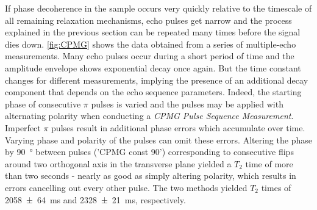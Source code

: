 \documentclass[
    parskip=half, 
    twoside=false,
    twocolumn=true,
    fontsize=11pt,
]{scrarticle}
\begin{document}
If phase decoherence in the sample occurs very quickly relative to the timescale of all remaining relaxation mechanisms, echo pulses get narrow and the process explained in the previous section can be repeated many times before the signal dies down. \autoref{fig:CPMG} shows the data obtained from a series of multiple-echo measurements. Many echo pulses occur during a short period of time and the amplitude envelope shows exponential decay once again. But the time constant changes for different measurements, implying the presence of an additional decay component that depends on the echo sequence parameters. Indeed, the starting phase of consecutive $\pi$ pulses is varied and the pulses may be applied with alternating polarity when conducting a \textit{CPMG Pulse Sequence Measurement}. Imperfect $\pi$ pulses result in additional phase errors which accumulate over time. Varying phase and polarity of the pulses can omit these errors. Altering the phase by \SI{90}{\degree} between pulses ('CPMG const 90') corresponding to consecutive flips around two orthogonal axis in the transverse plane yielded a $T_2$ time of more than two seconds - nearly as good as simply altering polarity, which results in errors cancelling out every other pulse. The two methods yielded $T_2$ times of \SI{2058 \pm 64}{\milli \second} and \SI{2328 \pm 21}{\milli \second}, respectively.
\end{document}
